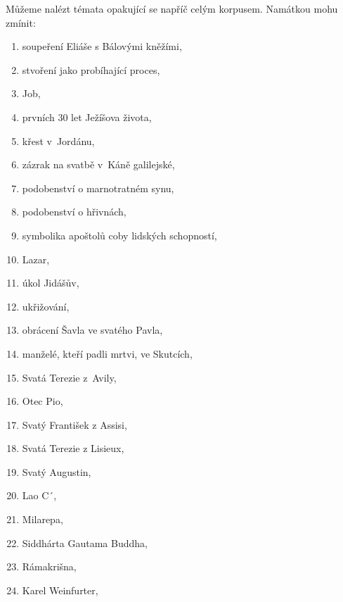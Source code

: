 Můžeme nalézt témata opakující se napříč celým korpusem.
Namátkou mohu zmínit:

\begin{enumerate}
\item{soupeření Eliáše s Bálovými kněžími,}
\item{stvoření jako probíhající proces,}
\item{Job,\\}

\item{prvních 30 let Ježíšova života,}
\item{křest v~Jordánu,}
\item{zázrak na svatbě v~Káně galilejské,}
\item{podobenství o marnotratném synu,}
\item{podobenství o hřivnách,}
\item{symbolika apoštolů coby lidských schopností,}
\item{Lazar,}
\item{úkol Jidášův,}
\item{ukřižování,\\}

\item{obrácení Šavla ve svatého Pavla,}
\item{manželé, kteří padli mrtvi, ve Skutcích,\\}

\item{Svatá Terezie z~Avily,}
\item{Otec Pio,}
\item{Svatý František z Assisi,}
\item{Svatá Terezie z Lisieux,}
\item{Svatý Augustin,\\}

\item{Lao C´,}
\item{Milarepa,}
\item{Siddhárta Gautama Buddha,}
\item{Rámakrišna,}
\item{Karel Weinfurter,\\}


\end{enumerate}
